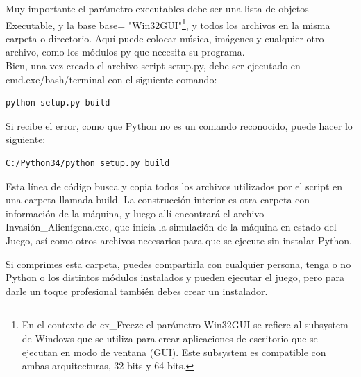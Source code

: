Muy importante el parámetro  {\ttfamily executables} debe ser una lista de objetos {\ttfamily  Executable}, y la base  base= {\ttfamily  "{}Win32GUI"{}}\footnote{En el contexto de {\ttfamily cx\_Freeze} el parámetro {\ttfamily  Win32GUI} se refiere al subsystem de Windows que se utiliza para crear aplicaciones de escritorio que se ejecutan en modo de ventana (GUI). Este subsystem es compatible con ambas arquitecturas, 32 bits y 64 bits.}, y todos los archivos en la misma carpeta o directorio.   Aquí puede colocar música, imágenes y cualquier otro archivo, como los módulos {\ttfamily py} que necesita su programa.\\






Bien, una vez creado el archivo {\ttfamily script setup.py},  debe ser  ejecutado  en {\ttfamily cmd.exe/bash/terminal} con el siguiente comando:
\begin{lstlisting}		
python setup.py build	
\end{lstlisting}

Si recibe el error, como que Python no es un comando reconocido, puede hacer lo siguiente:

\begin{lstlisting}		
C:/Python34/python setup.py build
\end{lstlisting}

Esta línea de código  busca y copia todos los archivos utilizados por el {\ttfamily script} en una carpeta llamada {\ttfamily build}. 
La construcción interior es otra carpeta con información de la máquina, y luego allí encontrará el archivo  {\ttfamily Invasión\_Alienígena.exe}, que inicia la simulación de la máquina en estado del Juego, así como otros archivos
necesarios para que se ejecute sin instalar Python. 

Si comprimes esta carpeta, puedes compartirla con cualquier persona, tenga o no Python o los distintos
módulos instalados y pueden ejecutar el juego, pero para darle un toque profesional también debes crear un instalador.










